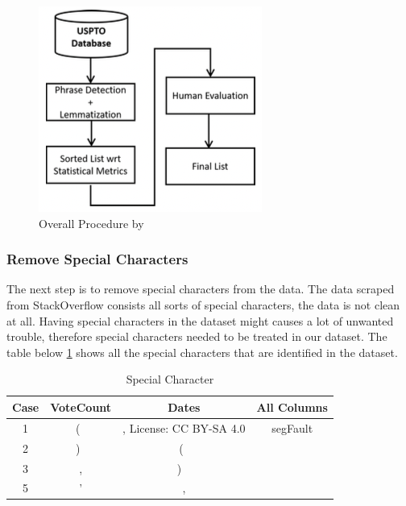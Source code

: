 \begin{figure}[H]
  \centering \includegraphics[scale=0.87]{assets/stopwords_2_overall.png}
\caption{Overall Procedure by \protect{}}\label{fig:overall_procedure_stopwords_curation}
\end{figure}

\subsubsection{Remove Special Characters}
The next step is to remove special characters from the data. The data scraped from StackOverflow consists all sorts of special characters, the data is not clean at all. Having special characters in the dataset might causes a lot of unwanted trouble, therefore special characters needed to be treated in our dataset. The table below \ref{table:special_character} shows all the special characters that are identified in the dataset. 

\begin{table}[ht]
 
  \caption{Special Character} %
  \centering %
  \begin{tabular}{c c c c} %
  \hline\hline %
  Case & VoteCount & Dates & All Columns \\ [0.5ex] %
  \hline %
  1 & ( \, & , License: CC BY-SA 4.0 & segFault \\ %
  2 & ) \, & ( \, &  \\
  3 & , & ) \ &  \\
  5 & ' & , & \\ [1ex] %
  \hline %
  \end{tabular}
  \label{table:special_character} %

\end{table}

